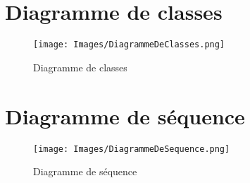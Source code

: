 \appendix

\section{Diagramme de classes}
\label{sec:Diagramme de classes}
  \begin{figure}[!h]
    \caption{Diagramme de classes}
    \centering
    \texttt{[image: Images/DiagrammeDeClasses.png]}
  \end{figure}

\newpage

\section{Diagramme de séquence}
\label{sec:Diagramme de séquence}
  \begin{figure}[!h]
    \caption{Diagramme de séquence}
    \centering
    \texttt{[image: Images/DiagrammeDeSequence.png]}
  \end{figure}
